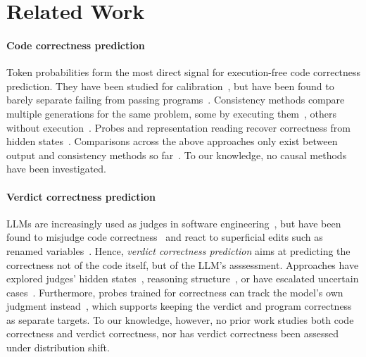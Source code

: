 \section{Related Work}
\label{sec:related}

\paragraph{Code correctness prediction}
Token probabilities form the most direct signal for execution-free code correctness prediction. They have been studied for calibration~\cite{Spiess2025Calib,Campos2026Multicalib}, but have been found to barely separate failing from passing programs~\cite{rathnasuriya2026overconfident}. Consistency methods compare multiple  generations for the same problem, some by executing them~\cite{valentin2026incoherence,sharma2025,he2026usingsemanticdistanceestimate}, others without execution~\cite{jain2023lightweight,shi2026codemorethantext,bouchard2026functional}. Probes and representation reading recover correctness from hidden states~\cite{bui2025openia,Vu2026Autoprobe,ribeiro2026repe,huang2025pttrust,lugoloobi2026llms}.
Comparisons across the above approaches only exist between output and consistency methods so far~\cite{bouchard2026functional}. %
To our knowledge, no causal methods have been investigated.

\paragraph{Verdict correctness prediction}
LLMs are increasingly used as judges in software engineering~\cite{he2025judgese}, but
 have been found to misjudge code correctness~\cite{crupi2025judge} and react to superficial edits such as renamed variables~\cite{moon2026cover}. %
Hence, {\it verdict correctness prediction} aims at predicting the correctness not of the code itself, but of the LLM's asssessment. 
Approaches have explored 
judges' hidden states~\cite{Radharapu2025CalibratingJudges}, reasoning structure~\cite{qi2026verdi}, or have escalated uncertain cases~\cite{jung2025trust}. 
Furthermore, probes trained for correctness can track the model's own judgment instead~\cite{lu2026diagnosing}, which supports keeping the verdict and program correctness as separate targets. To our knowledge, however, no prior work studies both code correctness and verdict correctness, nor has verdict correctness been assessed under distribution shift. 

